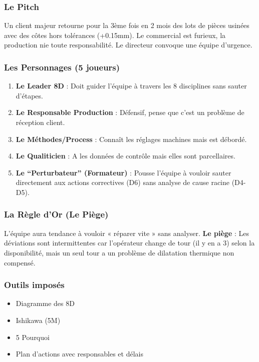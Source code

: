 \documentclass[
]{article}
\providecommand{\tightlist}{%
  \setlength{\itemsep}{0pt}\setlength{\parskip}{0pt}}
\begin{document}
\subsubsection{Le Pitch}\label{le-pitch-1}

Un client majeur retourne pour la 3ème fois en 2 mois des lots de pièces
usinées avec des côtes hors tolérances (+0.15mm). Le commercial est
furieux, la production nie toute responsabilité. Le directeur convoque
une équipe d'urgence.

\subsubsection{Les Personnages (5
joueurs)}\label{les-personnages-5-joueurs}

\begin{enumerate}
\def\labelenumi{\arabic{enumi}.}
\tightlist
\item
  \textbf{Le Leader 8D} : Doit guider l'équipe à travers les 8
  disciplines sans sauter d'étapes.
\item
  \textbf{Le Responsable Production} : Défensif, pense que c'est un
  problème de réception client.
\item
  \textbf{Le Méthodes/Process} : Connaît les réglages machines mais est
  débordé.
\item
  \textbf{Le Qualiticien} : A les données de contrôle mais elles sont
  parcellaires.
\item
  \textbf{Le ``Perturbateur'' (Formateur)} : Pousse l'équipe à vouloir
  sauter directement aux actions correctives (D6) sans analyse de cause
  racine (D4-D5).
\end{enumerate}

\subsubsection{La Règle d'Or (Le
Piège)}\label{la-ruxe8gle-dor-le-piuxe8ge-1}

L'équipe aura tendance à vouloir « réparer vite » sans analyser.
\textbf{Le piège} : Les déviations sont intermittentes car l'opérateur
change de tour (il y en a 3) selon la disponibilité, mais un seul tour a
un problème de dilatation thermique non compensé.

\subsubsection{Outils imposés}\label{outils-imposuxe9s-1}

\begin{itemize}
\tightlist
\item
  Diagramme des 8D
\item
  Ishikawa (5M)
\item
  5 Pourquoi
\item
  Plan d'actions avec responsables et délais
\end{itemize}
\end{document}
